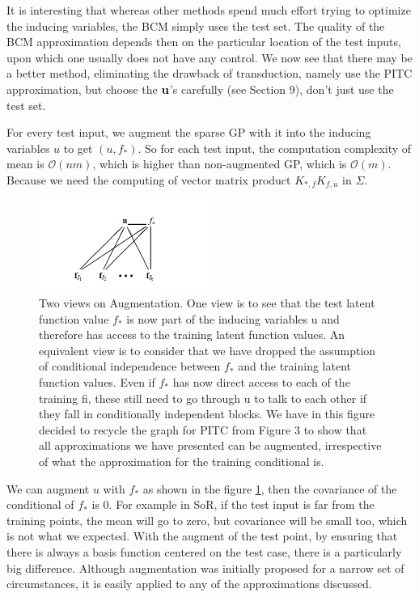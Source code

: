\documentclass[10pt]{elegantbook}
\begin{document}
It is interesting that whereas other methods spend much effort trying to optimize the inducing
variables, the BCM simply uses the test set. The quality of the BCM approximation depends then
on the particular location of the test inputs, upon which one usually does not have any control. We
now see that there may be a better method, eliminating the drawback of transduction, namely use
the PITC approximation, but choose the $\bf u$'s carefully (see Section 9), don't just use the test set.

\begin{definition}[Augment]
    For every test input, we augment the sparse GP with it into the inducing variables $u$ to get $(u, f_*)$. So for each test input, the computation complexity of 
    mean is $\mathcal O(nm)$, which is higher than non-augmented GP, which is $\mathcal O(m)$. Because we need the computing of vector matrix product
    $K_{*, f}K_{f, u}$ in $\Sigma$.
\end{definition}

\begin{figure}[htbp]
    \centering
    \includegraphics[width=0.5\textwidth]{image/transduction.png}
    \caption{Two views on Augmentation. One view is to see that the test latent function value $f_*$
is now part of the inducing variables u and therefore has access to the training latent
function values. An equivalent view is to consider that we have dropped the assumption
of conditional independence between $f_*$ and the training latent function values. Even if
$f_*$ has now direct access to each of the training fi, these still need to go through u to
talk to each other if they fall in conditionally independent blocks. We have in this figure
decided to recycle the graph for PITC from Figure 3 to show that all approximations we
have presented can be augmented, irrespective of what the approximation for the training
conditional is.} \label{fig:transduction}
\end{figure}

We can augment $u$ with $f_*$ as shown in the figure \ref{fig:transduction}, then the covariance of the conditional of $f_*$ is 0.
For example in SoR, if the test input is far from the training points, the mean will go to zero, but covariance will be small too, which is not 
what we expected. With the augment of the test point, by ensuring that there is always a basis function centered on the test case, there is a particularly big difference.
Although augmentation was initially proposed for a narrow set of circumstances, it is easily
applied to any of the approximations discussed.
\end{document}

